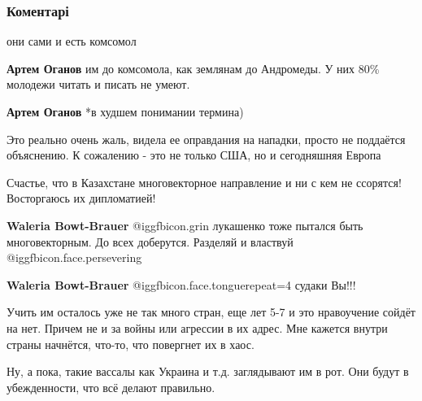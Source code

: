  
 
 
 
 
\subsubsection{Коментарі}
\label{sec:09_12_2021.fb.sharij_anatolij.1.travlja_usa_komsomol.cmt}

\begin{itemize} %
они сами и есть комсомол

\begin{itemize} %
\textbf{Артем Оганов} им до комсомола, как землянам до Андромеды. У них 80\% молодежи читать и писать не умеют.

\textbf{Артем Оганов} *в худшем понимании термина)
\end{itemize} %


Это реально очень жаль, видела ее оправдания на нападки, просто не поддаётся
объяснению. К сожалению - это не только США, но и сегодняшняя
Европа


Счастье, что в Казахстане многовекторное направление и ни с кем не ссорятся!
Восторгаюсь их дипломатией!

\begin{itemize} %
\textbf{Waleria Bowt-Brauer}  @igg{fbicon.grin} лукашенко тоже пытался быть многовекторным. До всех доберутся. Разделяй и властвуй @igg{fbicon.face.persevering} 

\textbf{Waleria Bowt-Brauer}  @igg{fbicon.face.tongue}{repeat=4} судаки Вы!!!
\end{itemize} %


Учить им осталось уже не так много стран, еще лет 5-7 и это нравоучение сойдёт
на нет. Причем не и за войны или агрессии в их адрес. Мне кажется внутри страны
начнётся, что-то, что повергнет их в хаос.

Ну, а пока, такие вассалы как Украина и т.д. заглядывают им в рот. Они будут в
убежденности, что всё делают правильно.


\end{itemize}

